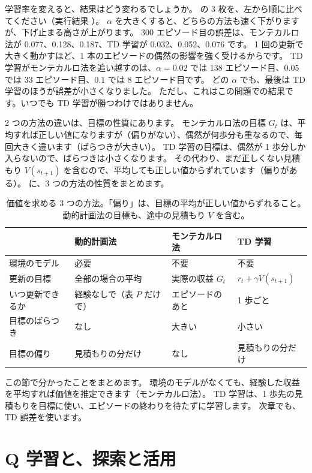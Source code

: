 学習率を変えると、結果はどう変わるでしょうか。
の 3 枚を、左から順に比べてください（実行結果 ）。
$\alpha$ を大きくすると、どちらの方法も速く下がりますが、下げ止まる高さが上がります。
300 エピソード目の誤差は、モンテカルロ法が 0.077、0.128、0.187、TD 学習が 0.032、0.052、0.076 です。
1 回の更新で大きく動かすほど、1 本のエピソードの偶然の影響を強く受けるからです。
TD 学習がモンテカルロ法を追い越すのは、$\alpha=0.02$ では 138 エピソード目、$0.05$ では 33 エピソード目、$0.1$ では 8 エピソード目です。
どの $\alpha$ でも、最後は TD 学習のほうが誤差が小さくなりました。
ただし、これはこの問題での結果です。いつでも TD 学習が勝つわけではありません。

2 つの方法の違いは、目標の性質にあります。
モンテカルロ法の目標 $G_t$ は、平均すれば正しい値になりますが（偏りがない）、偶然が何歩分も重なるので、毎回大きく違います（ばらつきが大きい）。
TD 学習の目標は、偶然が 1 歩分しか入らないので、ばらつきは小さくなります。
その代わり、まだ正しくない見積もり $V(s_{t+1})$ を含むので、平均しても正しい値からずれています（偏りがある）。
に、3 つの方法の性質をまとめます。

\begin{table}[tbp]
\centering
\caption{価値を求める 3 つの方法。「偏り」は、目標の平均が正しい値からずれること。動的計画法の目標も、途中の見積もり $V$ を含む。}
\label{tab:rlb-dp-mc-td}
\small
\begin{tabular}{llll}
\toprule
 & 動的計画法 & モンテカルロ法 & TD 学習 \\
\midrule
環境のモデル & 必要 & 不要 & 不要 \\
更新の目標 & 全部の場合の平均 & 実際の収益 $G_t$ & $r_t+\gamma V(s_{t+1})$ \\
いつ更新できるか & 経験なしで（表 $P$ だけで） & エピソードのあと & 1 歩ごと \\
目標のばらつき & なし & 大きい & 小さい \\
目標の偏り & 見積もりの分だけ & なし & 見積もりの分だけ \\
\bottomrule
\end{tabular}
\end{table}

この節で分かったことをまとめます。
環境のモデルがなくても、経験した収益を平均すれば価値を推定できます（モンテカルロ法）。
TD 学習は、1 歩先の見積もりを目標に使い、エピソードの終わりを待たずに学習します。
次章でも、TD 誤差を使います。

\section{Q 学習と、探索と活用}\label{sec:rlb-q}

